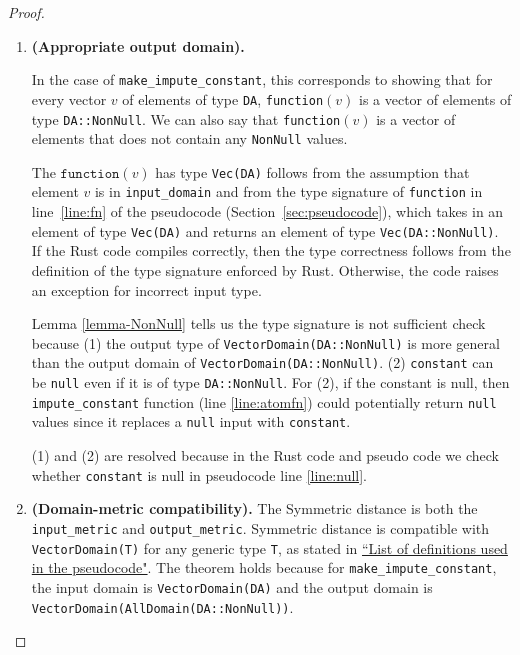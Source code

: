\documentclass[11pt,a4paper]{article}
\newcommand{\grace}[1]{{ {\color{purple}{(grace)~#1}}}}
\newcommand{\function}{\texttt{function}}
\begin{document}
\begin{proof}
\begin{enumerate}

\item \textbf{(Appropriate output domain).} 
\grace{Things to confirm: (1) is the type signature correct (input and output type)? The input and output domain correct? (2) What is the reason the type signature is not sufficient? Is it because the output type is more general than the output domain? Or is it theoretically because constant can be null value even if it has the type DA::NonNull? (3) so, is it correct that a variable with type DA::NonNull can contain null values?}


In the case of \texttt{make\_impute\_constant}, this corresponds to showing that for every vector $v$ of elements of type \texttt{DA},  \texttt{function}$(v)$ is a vector of elements of type \texttt{DA::NonNull}. We can also say that \texttt{function}$(v)$ is a vector of elements that does not contain any \texttt{NonNull} values.

The $\function(v)$ has type \texttt{Vec(DA)} follows from the assumption that element $v$ is in \texttt{input\_domain} and from the type signature of \texttt{function} in line~\ref{line:fn} of the pseudocode (Section~\ref{sec:pseudocode}), which takes in an element of type \texttt{Vec(DA)} and returns an element of type \texttt{Vec(DA::NonNull)}. If the Rust code compiles correctly, then the type correctness follows from the definition of the type signature enforced by Rust. Otherwise, the code raises an exception for incorrect input type. 

Lemma \ref{lemma-NonNull} tells us the type signature is not sufficient check because (1) the output type of \texttt{VectorDomain(DA::NonNull)} is more general than the output domain of \texttt{VectorDomain(DA::NonNull)}. \grace{?? The output type matches the output domain I wrote, so something's wrong.} (2) \texttt{constant} can be \texttt{null} even if it is of type \texttt{DA::NonNull}. For (2), if the constant is null, then \texttt{impute\_constant} function (line \ref{line:atomfn}) could potentially return \texttt{null} values since it replaces a \texttt{null} input with \texttt{constant}.


(1) and (2) are resolved because in the Rust code and pseudo code we check whether \texttt{constant} is null in pseudocode line \ref{line:null}.

\item \textbf{(Domain-metric compatibility).} The Symmetric distance is both the \texttt{input\_metric} and \texttt{output\_metric}. Symmetric distance is compatible with \texttt{VectorDomain(T)} for any generic type \texttt{T}, as stated in \href{https://www.overleaf.com/project/60d215bf90b337ac02200a99}{``List of definitions used in the pseudocode"}. The theorem holds because for \texttt{make\_impute\_constant}, the input domain is \texttt{VectorDomain(DA)} and the output domain is \texttt{VectorDomain(AllDomain(DA::NonNull))}. 


\end{enumerate}
\end{proof}
\end{document}
